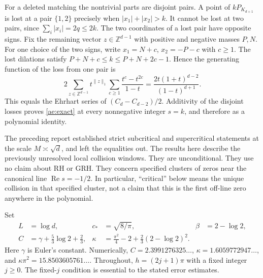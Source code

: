 For a deleted matching the nontrivial parts are disjoint pairs. A point
of $kP_{K_{d+1}}$ is lost at a pair $\{1,2\}$ precisely when
$|x_1|+|x_2|>k$. It cannot be lost at two pairs, since
$\sum_i|x_i|=2q\le2k$. The two coordinates of a lost pair have opposite
signs. Fix the remaining vector $z\in\mathbb Z^{d-1}$ with positive and
negative masses $P,N$. For one choice of the two signs, write
$x_1=N+c$, $x_2=-P-c$ with $c\ge1$. The lost dilations satisfy
$P+N+c\le k\le P+N+2c-1$. Hence the generating function of the loss
from one pair is
\[
 2\sum_{z\in\mathbb Z^{d-1}}t^{\|z\|_1}
       \sum_{c\ge1}\frac{t^c-t^{2c}}{1-t}
 =\frac{2t(1+t)^{d-2}}{(1-t)^{d+1}}.
\]
This equals the Ehrhart series of $(C_d-C_{d-2})/2$. Additivity of the
disjoint losses proves \eqref{ae:exact} at every nonnegative integer
$s=k$, and therefore as a polynomial identity.

The preceding report established strict subcritical and supercritical
statements at the scale $M\asymp\sqrt d$, and left the equalities out.
The results here describe the previously unresolved local collision
windows. They are unconditional. They use no claim about RH or GRH.
They concern specified clusters of zeros near the canonical line
$\operatorname{Re}s=-1/2$. In particular, ``critical'' below means the
unique collision in that specified cluster, not a claim that this is the
first off-line zero anywhere in the polynomial.

Set
\begin{align}
 L&=\log d,&c_*&=\sqrt{8/\pi},&\beta&=2-\log 2,\label{ae:constants1}\\
 C&=\gamma+\frac53\log2+\frac23,&
 \kappa&=\frac{\pi^2}{4}-2+\frac23(2-\log2)^2.\label{ae:constants2}
\end{align}
Here $\gamma$ is Euler's constant. Numerically,
$C=2.3991276325\ldots$, $\kappa=1.6059772947\ldots$, and
$\kappa\pi^2=15.8503605761\ldots$.
Throughout, $h=(2j+1)\pi$ with a fixed integer $j\ge0$.
The fixed-$j$ condition is essential to the stated error estimates.


